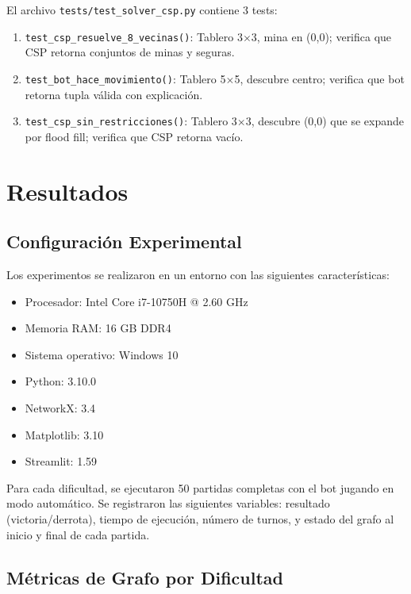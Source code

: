 \documentclass[12pt,a4paper]{article}
\begin{document}
El archivo \texttt{tests/test\_solver\_csp.py} contiene 3 tests:

\begin{enumerate}[itemsep=2pt]
    \item \texttt{test\_csp\_resuelve\_8\_vecinas()}: Tablero 3$\times$3, mina en (0,0); verifica que CSP retorna conjuntos de minas y seguras.
    \item \texttt{test\_bot\_hace\_movimiento()}: Tablero 5$\times$5, descubre centro; verifica que bot retorna tupla válida con explicación.
    \item \texttt{test\_csp\_sin\_restricciones()}: Tablero 3$\times$3, descubre (0,0) que se expande por flood fill; verifica que CSP retorna vacío.
\end{enumerate}

\section{Resultados}

\subsection{Configuración Experimental}

Los experimentos se realizaron en un entorno con las siguientes características:

\begin{itemize}[itemsep=2pt]
    \item Procesador: Intel Core i7-10750H @ 2.60 GHz
    \item Memoria RAM: 16 GB DDR4
    \item Sistema operativo: Windows 10
    \item Python: 3.10.0
    \item NetworkX: 3.4
    \item Matplotlib: 3.10
    \item Streamlit: 1.59
\end{itemize}

Para cada dificultad, se ejecutaron 50 partidas completas con el bot jugando en modo automático. Se registraron las siguientes variables: resultado (victoria/derrota), tiempo de ejecución, número de turnos, y estado del grafo al inicio y final de cada partida.

\subsection{Métricas de Grafo por Dificultad}
\end{document}
